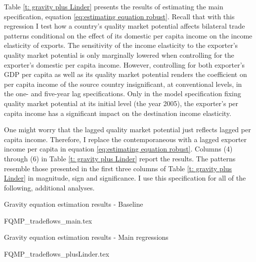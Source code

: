 \documentclass[12pt,a4paper,oneside,times]{article}   	%
\newcommand{\tablespath}{{"C:/Users/dhill/Dropbox/Dissertation"}}
\begin{document}
Table \ref{t: gravity plus Linder} presents the results of estimating the main specification, equation \eqref{eq:estimating equation robust}. Recall that with this regression I test how a country's quality market potential affects bilateral trade patterns conditional on the effect of its domestic per capita income on the income elasticity of exports.  The sensitivity of the income elasticity to the exporter's quality market potential is only marginally lowered when controlling for the exporter's domestic per capita income. However, controlling for both exporter's GDP per capita as well as its quality market potential renders the coefficient on per capita income of the source country insignificant, at conventional levels, in the one- and five-year lag specifications. Only in the model specification fixing quality market potential at its initial level (the year 2005), the exporter's per capita income has a significant impact on the destination income elasticity. 

One might worry that the lagged quality market potential just reflects lagged per capita income. Therefore, I replace the contemporaneous with a lagged exporter income per capita in equation \eqref{eq:estimating equation robust}. Columns (4) through (6) in Table \ref{t: gravity plus Linder} report the results. The patterns resemble those presented in the first three columns of Table \ref{t: gravity plus Linder} in magnitude, sign and significance. I use this specification for all of the following, additional analyses. 

\begin{table}[htbp]\centering
\caption{Gravity equation estimation results - Baseline \label{t: gravity main}}
{FQMP_tradeflows_main.tex}
\end{table}

\begin{table}[htbp]\centering
\caption{Gravity equation estimation results - Main regressions \label{t: gravity plus Linder}}
{FQMP_tradeflows_plusLinder.tex}
\end{table}
\end{document}
